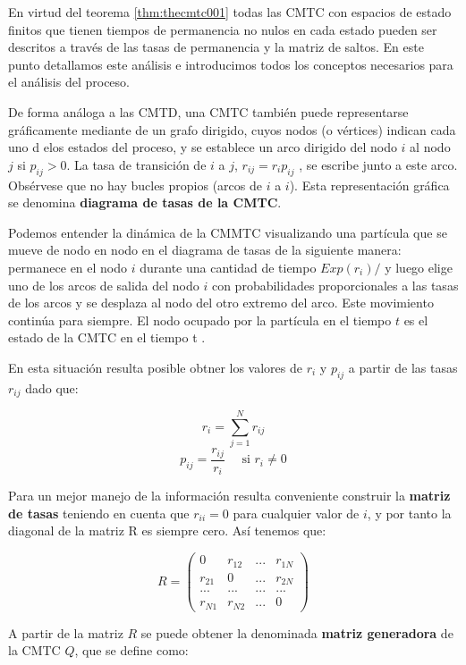 \documentclass[
]{book}
\theoremstyle{definition}
\theoremstyle{definition}
\theoremstyle{definition}
\theoremstyle{definition}
\theoremstyle{remark}
\begin{document}
En virtud del teorema \ref{thm:thecmtc001} todas las CMTC con espacios de estado finitos que tienen tiempos de permanencia no nulos en cada estado pueden ser descritos a través de las tasas de permanencia y la matriz de saltos. En este punto detallamos este análisis e introducimos todos los conceptos necesarios para el análisis del proceso.

De forma análoga a las CMTD, una CMTC también puede representarse gráficamente mediante de un grafo dirigido, cuyos nodos (o vértices) indican cada uno d elos estados del proceso, y se establece un arco dirigido del nodo \(i\) al nodo \(j\) si \(p_{ij} > 0\). La tasa de transición de \(i\) a \(j\), \(r_{ij} = r_i p_{ij}\) , se escribe junto a este arco. Obsérvese que no hay bucles propios (arcos de \(i\) a \(i\)). Esta representación gráfica se denomina \textbf{diagrama de tasas de la CMTC}.

Podemos entender la dinámica de la CMMTC visualizando una partícula que se mueve de nodo en nodo en el diagrama de tasas de la siguiente manera: permanece en el nodo \(i\) durante una cantidad de tiempo \(Exp(r_i)/\) y luego elige uno de los arcos de salida del nodo \(i\) con probabilidades proporcionales a las tasas de los arcos y se desplaza al nodo del otro extremo del arco. Este movimiento continúa para siempre. El nodo ocupado por la partícula en el tiempo \(t\) es el estado de la CMTC en el tiempo t .

En esta situación resulta posible obtner los valores de \(r_i\) y \(p_{ij}\) a partir de las tasas \(r_{ij}\) dado que:

\[r_i = \sum_{j=1}^{N} r_{ij}\] \[p_{ij} = \frac{r_{ij}}{r_i} \quad \text{ si } r_i \neq 0\]

Para un mejor manejo de la información resulta conveniente construir la \textbf{matriz de tasas} teniendo en cuenta que \(r_{ii} = 0\) para cualquier valor de \(i\), y por tanto la diagonal de la matriz R es siempre cero. Así tenemos que:

\[R = 
\begin{pmatrix}
0 & r_{12} & ... & r_{1N}\\
r_{21} & 0 & ... & r_{2N}\\
... & ... & ... & ...\\
r_{N1} & r_{N2} & ... & 0
\end{pmatrix}\]

A partir de la matriz \(R\) se puede obtener la denominada \textbf{matriz generadora} de la CMTC \(Q\), que se define como:
\end{document}
